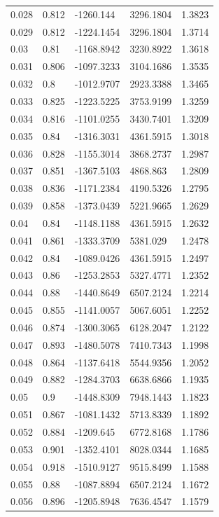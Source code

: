 \begin{tabular}{lllll}
0.028 & 0.812 & -1260.144 & 3296.1804 & 1.3823 \\
0.029 & 0.812 & -1224.1454 & 3296.1804 & 1.3714 \\
0.03 & 0.81 & -1168.8942 & 3230.8922 & 1.3618 \\
0.031 & 0.806 & -1097.3233 & 3104.1686 & 1.3535 \\
0.032 & 0.8 & -1012.9707 & 2923.3388 & 1.3465 \\
0.033 & 0.825 & -1223.5225 & 3753.9199 & 1.3259 \\
0.034 & 0.816 & -1101.0255 & 3430.7401 & 1.3209 \\
0.035 & 0.84 & -1316.3031 & 4361.5915 & 1.3018 \\
0.036 & 0.828 & -1155.3014 & 3868.2737 & 1.2987 \\
0.037 & 0.851 & -1367.5103 & 4868.863 & 1.2809 \\
0.038 & 0.836 & -1171.2384 & 4190.5326 & 1.2795 \\
0.039 & 0.858 & -1373.0439 & 5221.9665 & 1.2629 \\
0.04 & 0.84 & -1148.1188 & 4361.5915 & 1.2632 \\
0.041 & 0.861 & -1333.3709 & 5381.029 & 1.2478 \\
0.042 & 0.84 & -1089.0426 & 4361.5915 & 1.2497 \\
0.043 & 0.86 & -1253.2853 & 5327.4771 & 1.2352 \\
0.044 & 0.88 & -1440.8649 & 6507.2124 & 1.2214 \\
0.045 & 0.855 & -1141.0057 & 5067.6051 & 1.2252 \\
0.046 & 0.874 & -1300.3065 & 6128.2047 & 1.2122 \\
0.047 & 0.893 & -1480.5078 & 7410.7343 & 1.1998 \\
0.048 & 0.864 & -1137.6418 & 5544.9356 & 1.2052 \\
0.049 & 0.882 & -1284.3703 & 6638.6866 & 1.1935 \\
0.05 & 0.9 & -1448.8309 & 7948.1443 & 1.1823 \\
0.051 & 0.867 & -1081.1432 & 5713.8339 & 1.1892 \\
0.052 & 0.884 & -1209.645 & 6772.8168 & 1.1786 \\
0.053 & 0.901 & -1352.4101 & 8028.0344 & 1.1685 \\
0.054 & 0.918 & -1510.9127 & 9515.8499 & 1.1588 \\
0.055 & 0.88 & -1087.8894 & 6507.2124 & 1.1672 \\
0.056 & 0.896 & -1205.8948 & 7636.4547 & 1.1579 \\

\end{tabular}
